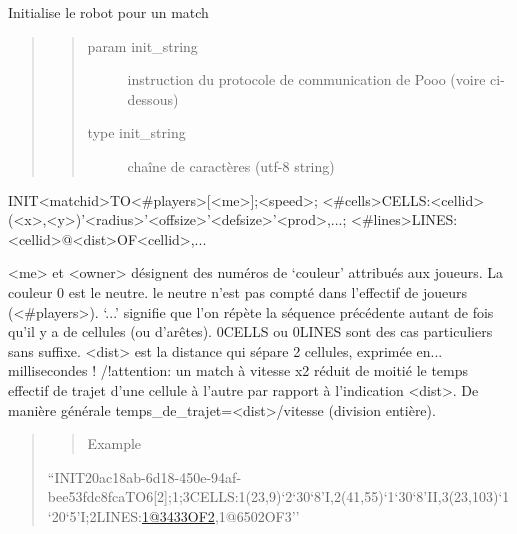 \documentclass[letterpaper,10pt,english]{sphinxmanual}
\begin{document}
\begin{fulllineitems}
\label{index:lolipooo.init_pooo}
Initialise le robot pour un match
\begin{quote}
\begin{quote}\begin{description}
\item[{param init\_string}] \leavevmode
instruction du protocole de communication de Pooo (voire ci-dessous)

\item[{type init\_string}] \leavevmode
chaîne de caractères (utf-8 string)

\end{description}\end{quote}
\end{quote}

INIT\textless{}matchid\textgreater{}TO\textless{}\#players\textgreater{}{[}\textless{}me\textgreater{}{]};\textless{}speed\textgreater{};       \textless{}\#cells\textgreater{}CELLS:\textless{}cellid\textgreater{}(\textless{}x\textgreater{},\textless{}y\textgreater{})'\textless{}radius\textgreater{}'\textless{}offsize\textgreater{}'\textless{}defsize\textgreater{}'\textless{}prod\textgreater{},...;       \textless{}\#lines\textgreater{}LINES:\textless{}cellid\textgreater{}@\textless{}dist\textgreater{}OF\textless{}cellid\textgreater{},...

\textless{}me\textgreater{} et \textless{}owner\textgreater{} désignent des numéros de `couleur' attribués aux joueurs. La couleur 0 est le neutre.
le neutre n'est pas compté dans l'effectif de joueurs (\textless{}\#players\textgreater{}).
`...' signifie que l'on répète la séquence précédente autant de fois qu'il y a de cellules (ou d'arêtes).
0CELLS ou 0LINES sont des cas particuliers sans suffixe.
\textless{}dist\textgreater{} est la distance qui sépare 2 cellules, exprimée en... millisecondes !
/!attention: un match à vitesse x2 réduit de moitié le temps effectif de trajet d'une cellule à l'autre par rapport à l'indication \textless{}dist\textgreater{}.
De manière générale temps\_de\_trajet=\textless{}dist\textgreater{}/vitesse (division entière).
\begin{quote}
\begin{quote}\begin{description}
\item[{Example}] \leavevmode
\end{description}\end{quote}

``INIT20ac18ab-6d18-450e-94af-bee53fdc8fcaTO6{[}2{]};1;3CELLS:1(23,9)`2`30`8'I,2(41,55)`1`30`8'II,3(23,103)`1`20`5'I;2LINES:\href{mailto:1@3433OF2}{1@3433OF2},1@6502OF3''
\end{quote}

\end{fulllineitems}
\end{document}
